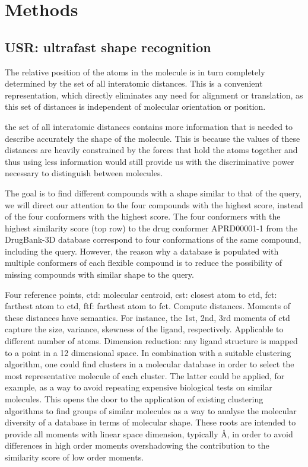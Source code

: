 \section{Methods}

\subsection{USR: ultrafast shape recognition}

The relative position of the atoms in the molecule is in turn completely determined by the set of all interatomic distances. This is a convenient representation, which directly eliminates any need for alignment or translation, as this set of distances is independent of molecular orientation or position.

the set of all interatomic distances contains more information that is needed to describe accurately the shape of the molecule. This is because the values of these distances are heavily constrained by the forces that hold the atoms together and thus using less information would still provide us with the discriminative power necessary to distinguish between molecules.

The goal is to find different compounds with a shape similar to that of the query, we will direct our attention to the four compounds with the highest score, instead of the four conformers with the highest score. The four conformers with the highest similarity score (top row) to the drug conformer APRD00001-1 from the DrugBank-3D database correspond to four conformations of the same compound, including the query. However, the reason why a database is populated with multiple conformers of each flexible compound is to reduce the possibility of missing compounds with similar shape to the query.

Four reference points, ctd: molecular centroid, cst: closest atom to ctd, fct: farthest atom to ctd, ftf: farthest atom to fct. Compute distances. Moments of these distances have semantics. For instance, the 1st, 2nd, 3rd moments of ctd capture the size, variance, skewness of the ligand, respectively. Applicable to different number of atoms. Dimension reduction: any ligand structure is mapped to a point in a 12 dimensional space. In combination with a suitable clustering algorithm, one could find clusters in a molecular database in order to select the most representative molecule of each cluster. The latter could be applied, for example, as a way to avoid repeating expensive biological tests on similar molecules.  This opens the door to the application of existing clustering algorithms to find groups of similar molecules as a way to analyse the molecular diversity of a database in terms of molecular shape. These roots are intended to provide all moments with linear space dimension, typically \AA, in order to avoid differences in high order moments overshadowing the contribution to the similarity score of low order moments.

